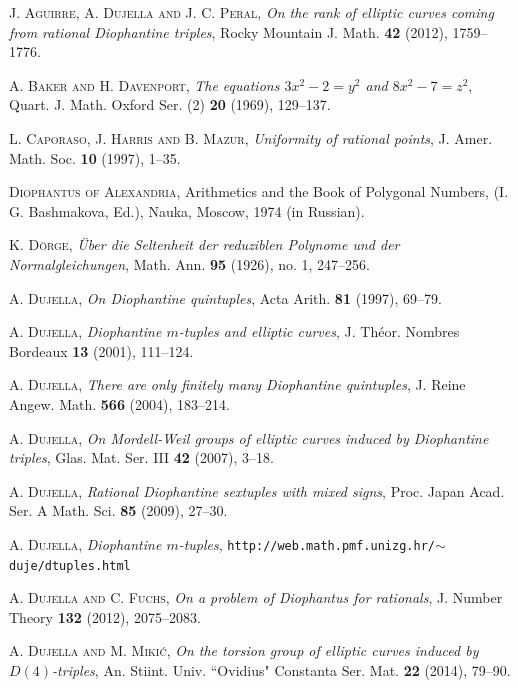 \documentclass[11pt]{amsart}
\theoremstyle{plain}
\theoremstyle{remark}
\begin{document}
\begin{thebibliography}{}

 \textsc{J. Aguirre, A. Dujella and J. C. Peral}, \textit{On the rank of elliptic curves coming from rational Diophantine triples}, Rocky Mountain J. Math. {\bf 42} (2012), 1759--1776.

 \textsc{A. Baker and H. Davenport}, \textit{The equations $3x^2 - 2 = y^2$ and $8x^2 - 7 = z^2$}, Quart. J. Math. Oxford Ser. (2) {\bf 20} (1969), 129--137.

 \textsc{L. Caporaso, J. Harris and B. Mazur}, \textit{Uniformity of
rational points}, J. Amer. Math. Soc. {\bf 10} (1997), 1--35.

 \textsc{Diophantus of Alexandria}, Arithmetics and the Book of
Polygonal Numbers, (I. G. Bashmakova, Ed.), Nauka, Moscow, 1974 (in Russian).

 \textsc{K. D\"orge}, \textit{\"Uber die Seltenheit der reduziblen Polynome und der Normalgleichungen}, Math. Ann. {\bf 95} (1926), no. 1, 247--256.

 \textsc{A. Dujella}, \textit{On Diophantine quintuples}, Acta Arith. {\bf 81} (1997), 69--79.

 \textsc{A. Dujella}, \textit{Diophantine $m$-tuples and elliptic curves}, J. Th\'eor. Nombres Bordeaux {\bf 13} (2001), 111--124.

 \textsc{A. Dujella}, \textit{There are only finitely many Diophantine quintuples}, J. Reine Angew. Math. {\bf 566} (2004), 183--214.

 \textsc{A. Dujella}, \textit{On Mordell-Weil groups of elliptic curves induced by Diophantine triples}, Glas. Mat. Ser. III {\bf 42} (2007), 3--18.

 \textsc{A. Dujella}, \textit{Rational Diophantine sextuples with mixed signs}, Proc. Japan Acad. Ser. A Math. Sci. {\bf 85} (2009), 27--30.

 \textsc{A. Dujella}, \textit{Diophantine $m$-tuples},
{\tt http://web.math.pmf.unizg.hr/$\sim$duje/dtuples.html}

 \textsc{A. Dujella and C. Fuchs}, \textit{On a problem of Diophantus for rationals},
J. Number Theory {\bf 132} (2012), 2075--2083.

 \textsc{A. Dujella and M. Miki\'c}, \textit{On the torsion group of elliptic curves induced by $D(4)$-triples}, An. Stiint. Univ. ``Ovidius" Constanta Ser. Mat. {\bf 22} (2014), 79--90.


\end{thebibliography}
\end{document}
